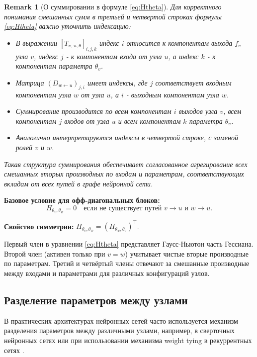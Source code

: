 \documentclass[11pt]{article}
\newtheorem{remark}{Remark}
\begin{document}
\begin{remark}[О суммировании в формуле \eqref{eq:Htheta}]
  Для корректного понимания смешанных сумм в третьей и четвертой строках формулы \eqref{eq:Htheta} важно
  уточнить индексацию:
  \begin{itemize}
    \item В выражении $[T_{v;\,u,\theta}]_{i,j,k}$ индекс $i$ относится к компонентам выхода $f_v$ узла $v$,
      индекс $j$ - к компонентам входа от узла $u$, а индекс $k$ - к компонентам параметра $\theta_v$.
    \item Матрица $(D_{w\gets u})_{j,i}$ имеет индексы, где $j$ соответствует входным компонентам узла $w$ от
      узла $u$, а $i$ - выходным компонентам узла $w$.
    \item Суммирование производится по всем компонентам $i$ выходов узла $v$, всем компонентам $j$ входов от
      узла $u$ и всем компонентам $k$ параметра $\theta_v$.
    \item Аналогично интерпретируются индексы в четвертой строке, с заменой ролей $v$ и $w$.
  \end{itemize}
  Такая структура суммирования обеспечивает согласованное агрегирование всех смешанных вторых производных по
  входам и параметрам, соответствующих вкладам от всех путей в графе нейронной сети.
\end{remark}

\textbf{Базовое условие для офф-диагональных блоков:}
\[
  H_{\theta_v,\theta_w}=0
  \quad\text{если не существует путей }v\to u\text{ и }w\to u.
\]

\textbf{Свойство симметрии:} $H_{\theta_v,\theta_w}=(H_{\theta_w,\theta_v})^\top$.

Первый член в уравнении \eqref{eq:Htheta} представляет Гаусс-Ньютон часть Гессиана. Второй член (активен
только при $v=w$) учитывает чистые вторые производные по параметрам. Третий и четвёртый члены отвечают за
смешанные производные между входами и параметрами для различных конфигураций узлов.

\subsection{Разделение параметров между узлами}

В практических архитектурах нейронных сетей часто используется механизм разделения параметров между
различными узлами, например, в сверточных нейронных сетях или при использовании механизма weight tying в
рекуррентных сетях \citep{pascanu2013difficulty}.
\end{document}

